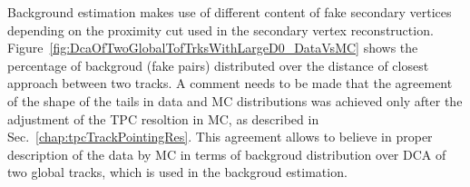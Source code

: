 
Background estimation makes use of different content of fake secondary vertices depending on the proximity cut used in the secondary vertex reconstruction. Figure~\ref{fig:DcaOfTwoGlobalTofTrksWithLargeD0_DataVsMC} shows the percentage of backgroud (fake pairs) distributed over the distance of closest approach between two tracks. A comment needs to be made that the agreement of the shape of the tails in data and MC distributions was achieved only after the adjustment of the TPC resoltion in MC, as described in Sec.~\ref{chap:tpcTrackPointingRes}. This agreement allows to believe in proper description of the data by MC in terms of backgroud distribution over DCA of two global tracks, which is used in the backgroud estimation.

